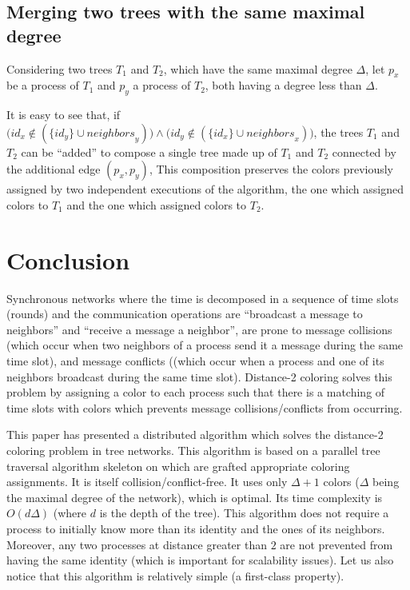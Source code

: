 \documentclass[11pt,english]{article}
\newcommand{\neighbors}{\mathit{neighbors}}
\begin{document}
\subsection{Merging two trees with the same maximal degree}
Considering two trees $T_1$ and $T_2$, which have the same maximal 
degree $\Delta$, let  $p_x$  be a process of $T_1$ and  
$p_y$ a process of $T_2$,  both having a degree less than $\Delta$. 

It is easy to see that, if $\big(id_x\notin (\{id_y\} \cup
\neighbors_y)\big)\wedge \big(id_y\notin (\{id_x\} \cup 
\neighbors_x)\big)$, the trees $T_1$ and $T_2$ can be ``added'' to  
compose a single tree made  up of $T_1$ and $T_2$ connected by the
additional edge $(p_x,p_y)$, This composition preserves the colors
previously assigned by two  independent executions of the algorithm, the 
one which assigned colors to $T_1$ and the one which assigned colors to $T_2$.



\section{Conclusion}
\label{sec:conclusion}
Synchronous networks where the time is decomposed in a sequence of
time slots (rounds) and the communication operations are ``broadcast a
message to neighbors'' and ``receive a message a neighbor'', are prone
to message collisions (which occur when two neighbors of a process
send it a message during the same time slot), and message conflicts
((which occur when a process and one of its neighbors broadcast during
the same time slot).  Distance-2 coloring solves this problem by
assigning a color to each process such that there is a matching of
time slots with colors which prevents message collisions/conflicts
from occurring.

This paper has presented a distributed algorithm which solves the
distance-2 coloring problem in tree networks.  This algorithm is based
on a parallel tree traversal algorithm skeleton on which are grafted
appropriate coloring assignments.  It is itself
collision/conflict-free. It uses only $\Delta+1$ colors ($\Delta$
being the maximal degree of the network), which is optimal. Its time
complexity is $O(d\Delta)$ (where $d$ is the depth of the tree). This
algorithm does not require a process to initially know more than its
identity and the ones of its neighbors. Moreover, any two processes at
distance greater than $2$ are not prevented from having the same
identity (which is important for scalability issues).  Let us also
notice that this algorithm is  relatively simple (a first-class property).
\end{document}
